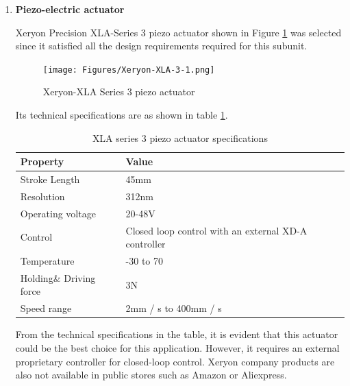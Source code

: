 \begin{enumerate}
    \item \textbf{Piezo-electric actuator}
    \par
      Xeryon Precision XLA-Series 3 piezo actuator shown in Figure \ref{fig:piezo_actuator} was selected since it satisfied all the design requirements required for this subunit.
    \begin{figure}[H]
        \centering
        \texttt{[image: Figures/Xeryon-XLA-3-1.png]}
        \caption[Xeryon-XLA Series 3 piezo actuator]{Xeryon-XLA Series 3 piezo actuator \cite{xla3}}
        \label{fig:piezo_actuator}
    \end{figure}
    Its technical specifications are as shown in table \ref{tab:XLA_stuff}.
    \begin{table}[H]
    \centering
      \caption[XLA series 3 piezo actuator specifications]{XLA series 3 piezo actuator specifications \cite{xla3}}
    \begin{tabular}{|l|l|}
    \hline
    \textbf{Property} & \textbf{Value} \\ \hline
    Stroke Length & 45mm \\ \hline
    Resolution & 312nm \\ \hline
    Operating voltage & 20-48V \\ \hline
    Control & Closed loop control with an external XD-A controller \\ \hline
    Temperature & -30  to 70 \\ \hline
    Holding\& Driving  force & 3N \\ \hline
    Speed range & 2mm / s to 400mm / s \\ \hline
    \end{tabular}
    \label{tab:XLA_stuff}
    \end{table}
    
    
    From the technical specifications in the table, it is evident that this actuator could be the best choice for this application. However, it requires an external proprietary controller for closed-loop control. Xeryon company products are also not available in public stores such as Amazon or Aliexpress.
    

\end{enumerate}
